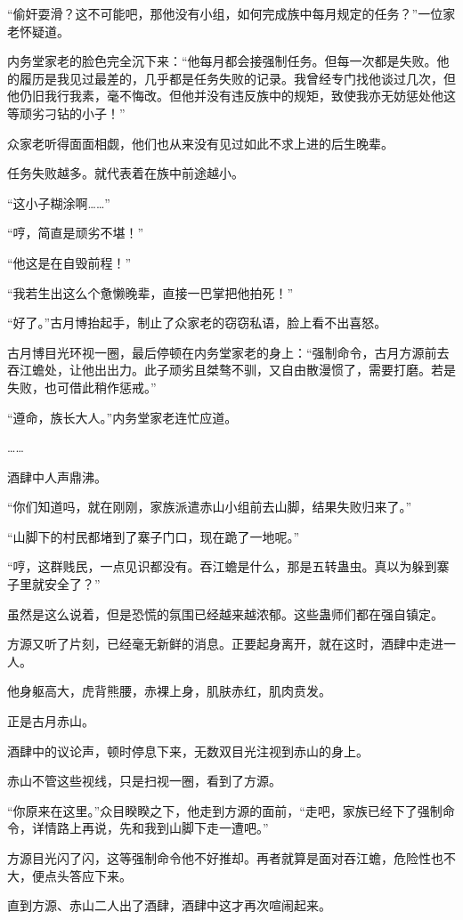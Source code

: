 \begin{this_body}
“偷奸耍滑？这不可能吧，那他没有小组，如何完成族中每月规定的任务？”一位家老怀疑道。

内务堂家老的脸色完全沉下来：“他每月都会接强制任务。但每一次都是失败。他的履历是我见过最差的，几乎都是任务失败的记录。我曾经专门找他谈过几次，但他仍旧我行我素，毫不悔改。但他并没有违反族中的规矩，致使我亦无妨惩处他这等顽劣刁钻的小子！”

众家老听得面面相觑，他们也从来没有见过如此不求上进的后生晚辈。

任务失败越多。就代表着在族中前途越小。

“这小子糊涂啊……”

“哼，简直是顽劣不堪！”

“他这是在自毁前程！”

“我若生出这么个惫懒晚辈，直接一巴掌把他拍死！”

“好了。”古月博抬起手，制止了众家老的窃窃私语，脸上看不出喜怒。

古月博目光环视一圈，最后停顿在内务堂家老的身上：“强制命令，古月方源前去吞江蟾处，让他出出力。此子顽劣且桀骜不驯，又自由散漫惯了，需要打磨。若是失败，也可借此稍作惩戒。”

“遵命，族长大人。”内务堂家老连忙应道。

……

酒肆中人声鼎沸。

“你们知道吗，就在刚刚，家族派遣赤山小组前去山脚，结果失败归来了。”

“山脚下的村民都堵到了寨子门口，现在跪了一地呢。”

“哼，这群贱民，一点见识都没有。吞江蟾是什么，那是五转蛊虫。真以为躲到寨子里就安全了？”

虽然是这么说着，但是恐慌的氛围已经越来越浓郁。这些蛊师们都在强自镇定。

方源又听了片刻，已经毫无新鲜的消息。正要起身离开，就在这时，酒肆中走进一人。

他身躯高大，虎背熊腰，赤裸上身，肌肤赤红，肌肉贲发。

正是古月赤山。

酒肆中的议论声，顿时停息下来，无数双目光注视到赤山的身上。

赤山不管这些视线，只是扫视一圈，看到了方源。

“你原来在这里。”众目睽睽之下，他走到方源的面前，“走吧，家族已经下了强制命令，详情路上再说，先和我到山脚下走一遭吧。”

方源目光闪了闪，这等强制命令他不好推却。再者就算是面对吞江蟾，危险性也不大，便点头答应下来。

直到方源、赤山二人出了酒肆，酒肆中这才再次喧闹起来。


\end{this_body}

